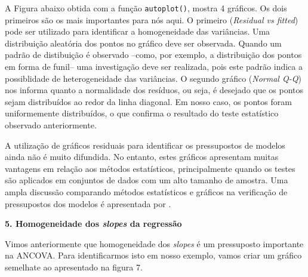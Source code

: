 \documentclass[
]{book}
\begin{document}
A Figura abaixo obtida com a função \texttt{autoplot()}, mostra 4 gráficos. Os dois primeiros são os mais importantes para nós aqui. O primeiro (\emph{Residual vs fitted}) pode ser utilizado para identificar a homogeneidade das variâncias. Uma distribuição aleatória dos pontos no gráfico deve ser observada. Quando um padrão de distibuição é observado --como, por exemplo, a distribuição dos pontos em forma de funil-- uma investigação deve ser realizada, pois este padrão indica a possiblidade de heterogeneidade das variâncias. O segundo gráfico (\emph{Normal Q-Q}) nos informa quanto a normalidade dos resíduos, ou seja, é desejado que os pontos sejam distribuídos ao redor da linha diagonal. Em nosso caso, os pontos foram uniformemente distribuídos, o que confirma o resultado do teste estatístico observado anteriormente.

\begin{vcsabia}
A utilização de gráficos residuais para identificar os pressupostos de modelos ainda não é muito difundida. No entanto, estes gráficos apresentam muitas vantagens em relação aos métodos estatísticos, principalmente quando os testes são aplicados em conjuntos de dados com um alto tamanho de amostra. Uma ampla discussão comparando métodos estatísticos e gráficos na verificação de pressupostos dos modelos é apresentada por \citet{Kozak2017}.
\end{vcsabia}

\textbf{5. Homogeneidade dos \emph{slopes} da regressão}

Vimos anteriormente que homogeneidade dos \emph{slopes} é um pressuposto importante na ANCOVA. Para identificarmos isto em nosso exemplo, vamos criar um gráfico semelhate ao apresentado na figura 7.
\end{document}
